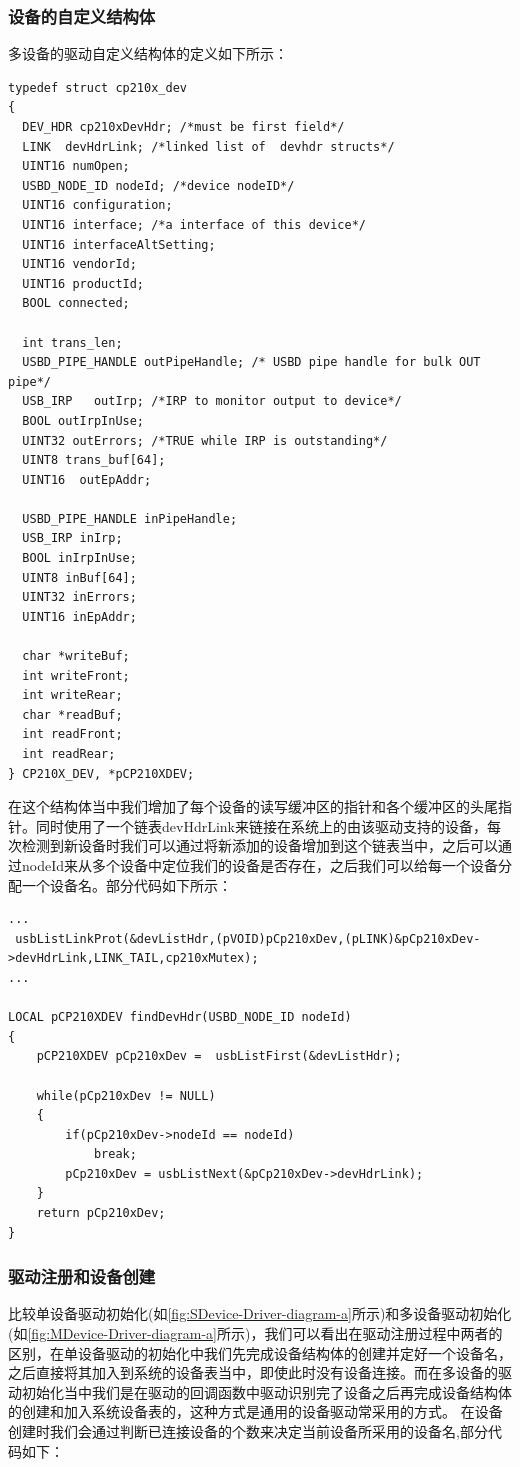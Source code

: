 \subsubsection{设备的自定义结构体}
多设备的驱动自定义结构体的定义如下所示：
\lstset{language=C}
\begin{lstlisting}
typedef struct cp210x_dev
{
  DEV_HDR cp210xDevHdr; /*must be first field*/
  LINK 	devHdrLink; /*linked list of  devhdr structs*/
  UINT16 numOpen;
  USBD_NODE_ID nodeId; /*device nodeID*/
  UINT16 configuration; 
  UINT16 interface; /*a interface of this device*/
  UINT16 interfaceAltSetting;
  UINT16 vendorId;
  UINT16 productId;
  BOOL connected;
  
  int trans_len;
  USBD_PIPE_HANDLE outPipeHandle; /* USBD pipe handle for bulk OUT pipe*/
  USB_IRP	outIrp; /*IRP to monitor output to device*/
  BOOL outIrpInUse;
  UINT32 outErrors; /*TRUE while IRP is outstanding*/
  UINT8 trans_buf[64];
  UINT16  outEpAddr;  
  
  USBD_PIPE_HANDLE inPipeHandle;
  USB_IRP inIrp;
  BOOL inIrpInUse;
  UINT8 inBuf[64];
  UINT32 inErrors;
  UINT16 inEpAddr;
  
  char *writeBuf;
  int writeFront;
  int writeRear;
  char *readBuf;
  int readFront;
  int readRear;
} CP210X_DEV, *pCP210XDEV;
\end{lstlisting}
	在这个结构体当中我们增加了每个设备的读写缓冲区的指针和各个缓冲区的头尾指针。同时使用了一个链表devHdrLink来链接在系统上的由该驱动支持的设备，每次检测到新设备时我们可以通过将新添加的设备增加到这个链表当中，之后可以通过nodeId来从多个设备中定位我们的设备是否存在，之后我们可以给每一个设备分配一个设备名。部分代码如下所示：
\lstset{language=C}
\begin{lstlisting}
...
 usbListLinkProt(&devListHdr,(pVOID)pCp210xDev,(pLINK)&pCp210xDev->devHdrLink,LINK_TAIL,cp210xMutex);
...

LOCAL pCP210XDEV findDevHdr(USBD_NODE_ID nodeId)
{
	pCP210XDEV pCp210xDev =  usbListFirst(&devListHdr);

	while(pCp210xDev != NULL)
	{
		if(pCp210xDev->nodeId == nodeId)
			break;
		pCp210xDev = usbListNext(&pCp210xDev->devHdrLink);
	}
	return pCp210xDev;
}
\end{lstlisting}

\subsubsection{驱动注册和设备创建}

	比较单设备驱动初始化(如\autoref{fig:SDevice-Driver-diagram-a}所示)和多设备驱动初始化(如\autoref{fig:MDevice-Driver-diagram-a}所示)，我们可以看出在驱动注册过程中两者的区别，在单设备驱动的初始化中我们先完成设备结构体的创建并定好一个设备名，之后直接将其加入到系统的设备表当中，即使此时没有设备连接。而在多设备的驱动初始化当中我们是在驱动的回调函数中驱动识别完了设备之后再完成设备结构体的创建和加入系统设备表的，这种方式是通用的设备驱动常采用的方式。
	在设备创建时我们会通过判断已连接设备的个数来决定当前设备所采用的设备名,部分代码如下：

